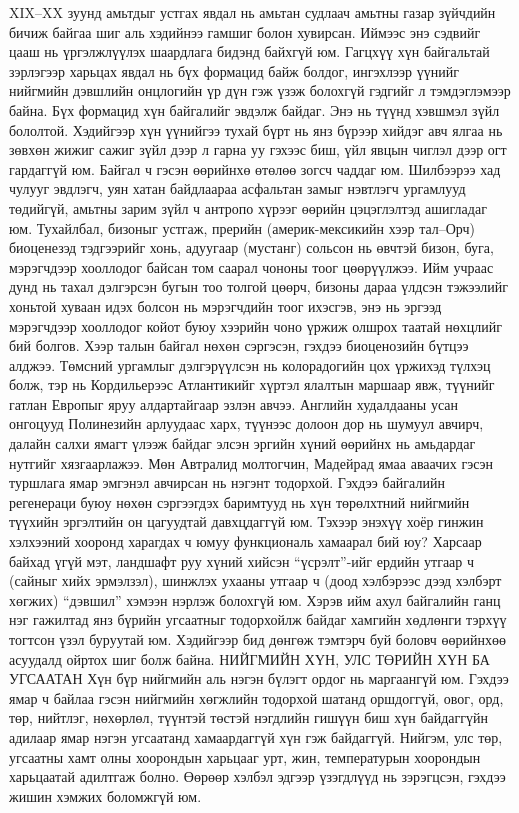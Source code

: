 XIX–XX зуунд амьтдыг устгах явдал нь амьтан судлаач амьтны газар зүйчдийн бичиж байгаа шиг аль хэдийнээ гамшиг болон хувирсан. Иймээс энэ сэдвийг цааш нь үргэлжлүүлэх шаардлага бидэнд байхгүй юм. Гагцхүү хүн байгальтай зэрлэгээр харьцах явдал нь бүх формацид байж болдог, ингэхлээр үүнийг нийгмийн дэвшлийн онцлогийн үр дүн гэж үзэж болохгүй гэдгийг л тэмдэглэмээр байна. Бүх формацид хүн байгалийг эвдэлж байдаг. Энэ нь түүнд хэвшмэл зүйл бололтой. Хэдийгээр хүн үүнийгээ тухай бүрт нь янз бүрээр хийдэг авч ялгаа нь зөвхөн жижиг сажиг зүйл дээр л гарна уу гэхээс биш, үйл явцын чиглэл дээр огт гардаггүй юм.
Байгал ч гэсэн өөрийнхө өтөлөө зогсч чаддаг юм. Шилбээрээ хад чулууг эвдлэгч, уян хатан байдлаараа асфальтан замыг нэвтлэгч ургамлууд төдийгүй, амьтны зарим зүйл ч антропо хүрээг өөрийн цэцэглэлтэд ашигладаг юм. Тухайлбал, бизоныг устгаж, прерийн (америк-мексикийн хээр тал–Орч) биоценезэд тэдгээрийг хонь, адуугаар (мустанг) сольсон нь өвчтэй бизон, буга, мэрэгчдээр хооллодог байсан том саарал чононы тоог цөөрүүлжээ. Ийм учраас дунд нь тахал дэлгэрсэн бугын тоо толгой цөөрч, бизоны дараа үлдсэн тэжээлийг хоньтой хуваан идэх болсон нь мэрэгчдийн тоог ихэсгэв, энэ нь эргээд мэрэгчдээр хооллодог койот буюу хээрийн чоно үржиж олшрох таатай нөхцлийг бий болгов. Хээр талын байгал нөхөн сэргэсэн, гэхдээ биоценозийн бүтцээ алджээ.
Төмсний ургамлыг дэлгэрүүлсэн нь колорадогийн цох үржихэд түлхэц болж, тэр нь Кордильерээс Атлантикийг хүртэл ялалтын маршаар явж, түүнийг гатлан Европыг яруу алдартайгаар эзлэн авчээ. Английн худалдааны усан онгоцууд Полинезийн арлуудаас харх, түүнээс долоон дор нь шумуул авчирч, далайн салхи ямагт үлээж байдаг элсэн эргийн хүний өөрийнх нь амьдардаг нутгийг хязгаарлажээ. Мөн Автралид молтогчин, Мадейрад ямаа аваачих гэсэн туршлага ямар эмгэнэл авчирсан нь нэгэнт тодорхой. Гэхдээ байгалийн регенераци буюу нөхөн сэргээгдэх баримтууд нь хүн төрөлхтний нийгмийн түүхийн эргэлтийн он цагуудтай давхцдаггүй юм. Тэхээр энэхүү хоёр гинжин хэлхээний хооронд харагдах ч юмуу функциональ хамаарал бий юу? Харсаар байхад үгүй мэт, ландшафт руу хүний хийсэн “үсрэлт”-ийг ердийн утгаар ч (сайныг хийх эрмэлзэл), шинжлэх ухааны утгаар ч (доод хэлбэрээс дээд хэлбэрт хөгжих) “дэвшил” хэмээн нэрлэж болохгүй юм. Хэрэв ийм ахул байгалийн ганц нэг гажилтад янз бүрийн угсаатныг тодорхойлж байдаг хамгийн хөдлөнги тэрхүү тогтсон үзэл буруутай юм. Хэдийгээр бид дөнгөж тэмтэрч буй боловч өөрийнхөө асуудалд ойртох шиг болж байна.
НИЙГМИЙН ХҮН, УЛС ТӨРИЙН ХҮН БА УГСААТАН
Хүн бүр нийгмийн аль нэгэн бүлэгт ордог нь маргаангүй юм. Гэхдээ ямар ч байлаа гэсэн нийгмийн хөгжлийн тодорхой шатанд оршдоггүй, овог, орд, төр, нийтлэг, нөхөрлөл, түүнтэй төстэй нэгдлийн гишүүн биш хүн байдаггүйн адилаар ямар нэгэн угсаатанд хамаардаггүй хүн гэж байдаггүй. Нийгэм, улс төр, угсаатны хамт олны хоорондын харьцааг урт, жин, температурын хоорондын харьцаатай адилтгаж болно. Өөрөөр хэлбэл эдгээр үзэгдлүүд нь зэрэгцсэн, гэхдээ жишин хэмжих боломжгүй юм.

